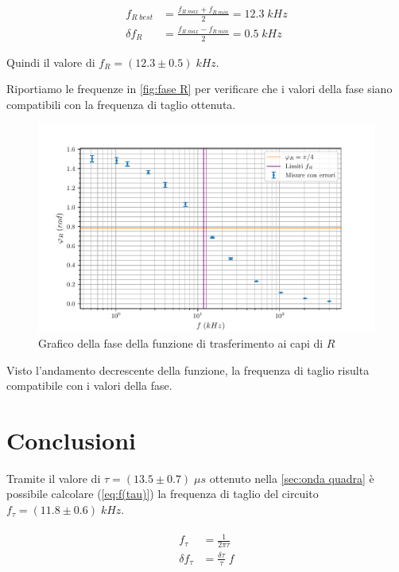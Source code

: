 \documentclass[11pt, a4paper]{article}
\numberwithin{equation}{section} %
\begin{document}
\begin{align*}
    f_{R \; best} &= \frac{f_{R \; max} + f_{R \; min}}{2} = 12.3  \; kHz \\
    \delta f_{R} &= \frac{f_{R \; max} - f_{R \; min}}{2} = 0.5 \; kHz
\end{align*}

Quindi il valore di \(f_{R} = (12.3 \pm 0.5) \; kHz\).

Riportiamo le frequenze in \autoref{fig:fase R} per verificare che i valori della fase siano compatibili con la frequenza di taglio ottenuta.

\begin{figure}[ht!]
    \includegraphics{onda_sin_phi(f)_R.pdf}
    \caption{Grafico della fase della funzione di trasferimento ai capi di $R$}
    \label{fig:fase R}
\end{figure}

Visto l'andamento decrescente della funzione, la frequenza di taglio risulta compatibile con i valori della fase.

\newpage

\section{Conclusioni}

Tramite il valore di $\tau = (13.5 \pm 0.7) \; \mu s$ ottenuto nella \autoref{sec:onda quadra} è possibile calcolare (\autoref{eq:f(tau)}) la frequenza di taglio del circuito $f_{\tau} = (11.8 \pm 0.6) \; kHz$.

\begin{align} \label{eq:f(tau)}
    \begin{split}
        f_{\tau} &= \frac{1}{2 \pi \tau} \\
        \delta f_{\tau} &= \frac{\delta \tau}{\tau} \; f
    \end{split}
\end{align}
\end{document}
